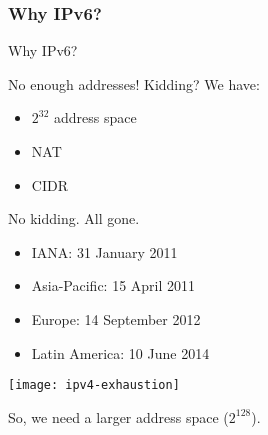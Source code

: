 \subsubsection{Why IPv6?}
  


\begin{frame}{Why IPv6?}
  \begin{minipage}{.54\linewidth}
  \begin{iblock}{No enough addresses!}
    Kidding? We have:
    \begin{itemize}
    \item $2^{32}$ address space
    \item NAT
    \item CIDR
    \end{itemize}
    No kidding. All gone.
    \begin{itemize}
    \item IANA: 31 January 2011
    \item Asia-Pacific: 15 April 2011
    \item Europe: 14 September 2012
    \item Latin America: 10 June 2014
    \end{itemize}
  \end{iblock}
  \end{minipage}\hfill
  \begin{minipage}{.45\linewidth}
    \texttt{[image: ipv4-exhaustion]}
  \end{minipage}

  So, we need a larger address space ($2^{128}$).
\end{frame}

